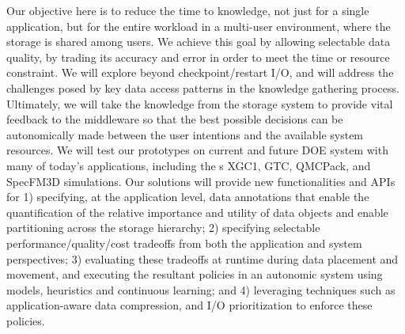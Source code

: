 Our objective here is to reduce the time to knowledge, not just for a single
application, but for the entire workload in a multi-user environment, where
the storage is shared among users.
We achieve this goal by allowing selectable data quality, by trading its accuracy and error
in order to meet the time or resource constraint. 
We will explore beyond 
checkpoint/restart I/O, and will address the challenges posed by 
key
data access patterns in the knowledge gathering process.
Ultimately, we will take the knowledge from the storage system to provide vital feedback to the middleware 
so that the best possible decisions can be autonomically made between the user intentions and
the available system resources.  
We will test our prototypes  on current and future DOE system with many of today's applications, including the
s XGC1, GTC, QMCPack, and SpecFM3D simulations. 
Our solutions will provide  new functionalities and APIs for
1) specifying, at the application level, data annotations that enable the
quantification of the relative importance and utility of data objects and
enable partitioning  across the storage hierarchy;
2) specifying selectable performance/quality/cost tradeoffs from both the
application and system perspectives;
3) evaluating these tradeoffs at runtime during data placement and movement,
and executing the resultant policies in an autonomic system using models,
heuristics and continuous learning; and
4) leveraging techniques such as application-aware data compression, 
and I/O prioritization to enforce these
policies.
\noindent

\vfill
